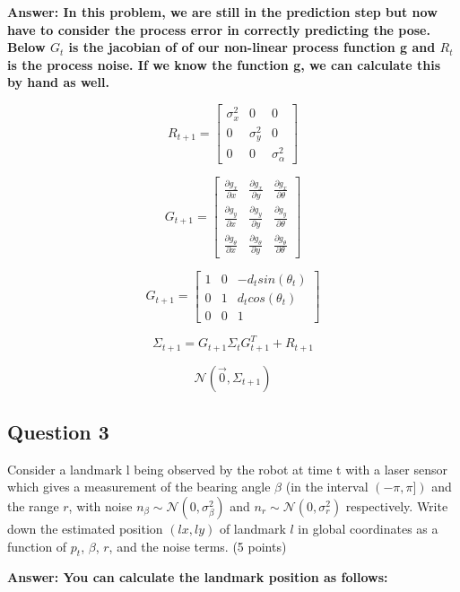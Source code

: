\documentclass[12pt, a4paper]{article}
\begin{document}
\textbf{Answer: In this problem, we are still in the prediction step but now have to consider the process error in correctly predicting the pose. Below $G_t$ is the jacobian of of our non-linear process function g and $R_t$ is the process noise. If we know the function g, we can calculate this by hand as well.}

$$R_{t+1} = 
\begin{bmatrix}
    \sigma_x^2 & 0          & 0 \\
    0          & \sigma_y^2 & 0 \\
    0          & 0          & \sigma_{\alpha}^2    
\end{bmatrix}
$$

$$G_{t+1} = 
\begin{bmatrix}
    \frac{\partial g_x}{\partial x} & \frac{\partial g_x}{\partial y} & \frac{\partial g_x}{\partial \theta} \\
    \frac{\partial g_y}{\partial x} & \frac{\partial g_y}{\partial y} & \frac{\partial g_y}{\partial \theta} \\
    \frac{\partial g_{\theta}}{\partial x} & \frac{\partial g_{\theta}}{\partial y} & \frac{\partial g_{\theta}}{\partial \theta}
\end{bmatrix}$$

$$G_{t+1} = 
\begin{bmatrix}
    1 & 0 & -d_t sin(\theta_t) \\
    0 & 1 & d_t cos(\theta_t) \\
    0 & 0& 1
\end{bmatrix}$$

$$\Sigma_{t+1} = G_{t+1} \Sigma_{t} G_{t+1}^T + R_{t+1}$$

$$\mathcal{N}(\vec{0}, \Sigma_{t+1})$$

\subsection{Question 3}
Consider a landmark l being observed by the robot at time t with a laser sensor
which gives a measurement of the bearing angle $\beta$ (in the interval $(-\pi, \pi])$ and
the range $r$, with noise $n_{\beta} \sim \mathcal{N}(0, \sigma^2_{\beta})$ and $n_r \sim \mathcal{N}(0, \sigma^2_r )$ 
respectively. Write down the estimated position $(lx, ly)$ of landmark $l$ in global coordinates as a function of $p_t$, $\beta$, $r$, and the noise terms. (5 points)


\textbf{Answer: You can calculate the landmark position as follows:}
\end{document}

